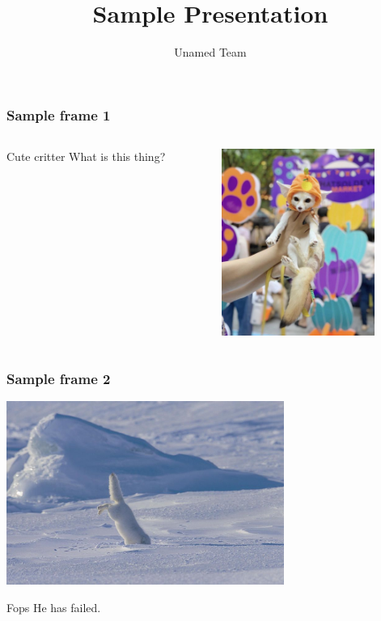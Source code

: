 \documentclass{beamer}
\title{Sample Presentation}
\author{Unamed Team}
\institute{SNHU/CETA, EG-310}
\begin{document}
\frame{\titlepage} %

\begin{frame}
\frametitle{Sample frame 1}

\begin{columns}
    \begin{column}{0.48\textwidth}
        \begin{block}{Cute critter}
            What is this thing?
        \end{block}
    \end{column}
    \begin{column}{0.48\textwidth}
        \includegraphics[width=5cm]{what_is_this_thing}
    \end{column}
\end{columns}

\end{frame}


\begin{frame}
\frametitle{Sample frame 2}

\includegraphics[height=6cm]{pounce}

\begin{block}{Fops}
    He has failed.
\end{block}

\end{frame}
\end{document}
